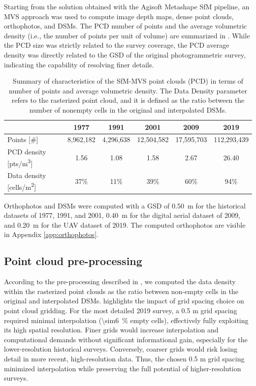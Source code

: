 Starting from the solution obtained with the Agisoft Metashape SfM pipeline, an MVS approach was used to compute image depth maps, dense point clouds, orthophotos, and DSMs. 
The PCD number of points and the average volumetric density (i.e., the number of points per unit of volume) are summarized in .
While the PCD size was strictly related to the survey coverage, the PCD average density was directly related to the GSD of the original photogrammetric survey, indicating the capability of resolving finer details.

\begin{table}
    \centering
    \caption{Summary of characteristics of the SfM-MVS point clouds (PCD) in terms of number of points and average volumetric density. 
    The Data Density parameter refers to the rasterized point cloud, and it is defined as the ratio between the number of nonempty cells in the original and interpolated DSMs.}
    \label{tab:2:pcd_stats}
    \begin{tabular}{lccccc}
        \hline
        & 1977 & 1991 & 2001 & 2009 & 2019 \\
        \hline
        Points [\#] & 8,962,182 & 4,296,638 & 12,504,582 & 17,595,703 & 112,293,439 \\
        PCD density [pts/m\textsuperscript{3}] & 1.56 & 1.08 & 1.58 & 2.67 & 26.40 \\
        Data density [cells/m\textsuperscript{2}] & 37\% & 11\% & 39\% & 60\% & 94\% \\
        \hline
    \end{tabular}
\end{table}

Orthophotos and DSMs were computed with a GSD of \SI{0.50}{\meter} for the historical datasets of 1977, 1991, and 2001, \SI{0.40}{\meter} for the digital aerial dataset of 2009, and \SI{0.20}{\meter} for the UAV dataset of 2019.
The computed orthophotos are visible in Appendix \ref{app:orthophotos}.

\subsection{Point cloud pre-processing}\label{sec:2:res_preproc}

According to the pre-processing described in , we computed the data density within the rasterized point clouds as the ratio between non-empty cells in the original and interpolated DSMs.
 highlights the impact of grid spacing choice on point cloud gridding. 
For the most detailed 2019 survey, a 0.5 m grid spacing required minimal interpolation (\SI{\sim6}{\percent} empty cells), effectively fully exploiting its high spatial resolution. 
Finer grids would increase interpolation and computational demands without significant informational gain, especially for the lower-resolution historical surveys. 
Conversely, coarser grids would risk losing detail in more recent, high-resolution data. Thus, the chosen 0.5 m grid spacing minimized interpolation while preserving the full potential of higher-resolution surveys.


